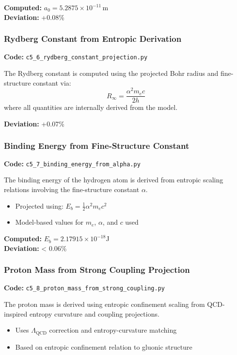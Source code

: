 \documentclass[10.5pt,a4paper]{article}
\begin{document}
\noindent\textbf{Computed:} \( a_0 = 5.2875 \times 10^{-11} \,\mathrm{m} \)\\
\textbf{Deviation:} +0.08\%

\subsubsection{Rydberg Constant from Entropic Derivation}

\textbf{Code:} \texttt{c5\_6\_rydberg\_constant\_projection.py}

The Rydberg constant is computed using the projected Bohr radius and fine-structure constant via:
\[
R_\infty = \frac{\alpha^2 m_e c}{2 h}
\]
where all quantities are internally derived from the model.

\textbf{Deviation:} +0.07\%

\subsubsection{Binding Energy from Fine-Structure Constant}

\textbf{Code:} \texttt{c5\_7\_binding\_energy\_from\_alpha.py}

The binding energy of the hydrogen atom is derived from entropic scaling relations involving the fine-structure constant \(\alpha\).

\begin{itemize}
    \item Projected using: \( E_b = \frac{1}{2} \alpha^2 m_e c^2 \)
    \item Model-based values for \( m_e \), \(\alpha\), and \( c \) used
\end{itemize}

\textbf{Computed:} \( E_b = 2.17915 \times 10^{-18} \)J \\
\textbf{Deviation:} < 0.06\%

\subsubsection{Proton Mass from Strong Coupling Projection}

\textbf{Code:} \texttt{c5\_8\_proton\_mass\_from\_strong\_coupling.py}

The proton mass is derived using entropic confinement scaling from QCD-inspired entropy curvature and coupling projections.

\begin{itemize}
    \item Uses \(\Lambda_{\text{QCD}}\) correction and entropy-curvature matching
    \item Based on entropic confinement relation to gluonic structure
\end{itemize}
\end{document}
